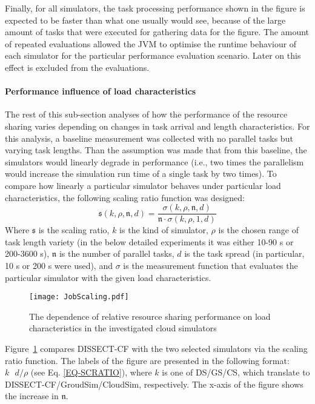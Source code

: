 \documentclass[sort, compress, 5p]{elsarticle}
\begin{document}
Finally, for all simulators, the task processing performance shown in the figure is expected to be faster than what one usually would see, because of the large amount of tasks that were executed for gathering data for the figure. The amount of repeated evaluations allowed the JVM to optimise the runtime behaviour of each simulator for the particular performance evaluation scenario. Later on this effect is excluded from the evaluations.

\paragraph{Performance influence of load characteristics}

The rest of this sub-section analyses of how the performance of the resource sharing varies depending on changes in task arrival and length characteristics. For this analysis, a baseline measurement was collected with no parallel tasks but varying task lengths. Than the assumption was made that from this baseline, the simulators would linearly degrade in performance (i.e., two times the parallelism would increase the simulation run time of a single task by two times). To compare how linearly a particular simulator behaves under particular load characteristics, the following scaling ratio function was designed:
\begin{equation} \label{EQ-SCRATIO}
\mathfrak{s}(k,\rho,\mathfrak{n},d)=\frac{\sigma(k,\rho,\mathfrak{n},d)}{\mathfrak{n}\cdot\sigma(k,\rho,1,d)}
\end{equation}
Where $\mathfrak{s}$ is the scaling ratio, $k$ is the kind of simulator, $\rho$ is the chosen range of task length variety (in the below detailed experiments it was either 10-90 s or 200-3600 s), $\mathfrak{n}$ is the number of parallel tasks, $d$ is the task spread (in particular, 10 s or 200 s were used), and $\sigma$ is the measurement function that evaluates the particular simulator with the given load characteristics.

\begin{figure}[tb]
\center
\texttt{[image: JobScaling.pdf]}
\caption{The dependence of relative resource sharing performance on load characteristics in the investigated cloud simulators\label{FIG-JobScalingCompare}}
\end{figure}

Figure~\ref{FIG-JobScalingCompare} compares DISSECT-CF with the two selected simulators via the scaling ratio function. The labels of the figure are presented in the following format: $k\textrm{ }d/\rho$ (see Eq. \ref{EQ-SCRATIO}), where $k$ is one of DS/GS/CS, which translate to DISSECT-CF/GroudSim/CloudSim, respectively. The x-axis of the figure shows the increase in $\mathfrak{n}$.
\end{document}
